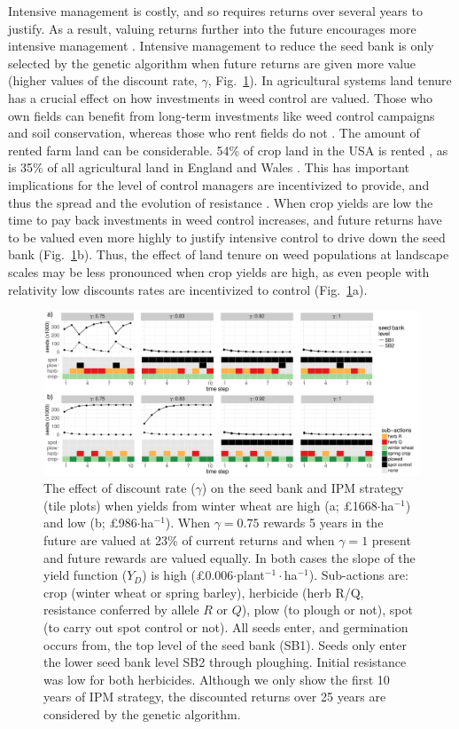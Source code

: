 \documentclass[9pt,twocolumn,twoside,lineno]{pnas-new}
\begin{document}
Intensive management is costly, and so requires returns over several years to justify. As a result, valuing returns further into the future encourages more intensive management \citep{EpanN2010}. Intensive management to reduce the seed bank is only selected by the genetic algorithm when future returns are given more value (higher values of the discount rate, $\gamma$, Fig.\ \ref{fig:dis_rate}). In agricultural systems land tenure has a crucial effect on how investments in weed control are valued. Those who own fields can benefit from long-term investments like weed control campaigns and soil conservation, whereas those who rent fields do not \citep{Wies1996, Fras2004}. The amount of rented farm land can be considerable. 54\% of crop land in the USA is rented \citep{Bige2016}, as is 35\% of all agricultural land in England and Wales \citep{CAAV2017}. This has important implications for the level of control managers are incentivized to provide, and thus the spread and the evolution of resistance \citep{Mare2012}. When crop yields are low the time to pay back investments in weed control increases, and future returns have to be valued even more highly to justify intensive control to drive down the seed bank (Fig.\ \ref{fig:dis_rate}b). Thus, the effect of land tenure on weed populations at landscape scales may be less pronounced when crop yields are high, as even people with relativity low discounts rates are incentivized to control (Fig.\ \ref{fig:dis_rate}a).

\begin{figure}
	\includegraphics[width=178mm]{dis_rate_SB_strat.pdf}
	\caption{The effect of discount rate ($\gamma$) on the seed bank and IPM strategy (tile plots) when yields from winter wheat are high (a; \pounds 1668$\cdot$ha$^{-1}$) and low (b; \pounds 986$\cdot$ha$^{-1}$). When $\gamma = 0.75$ rewards 5 years in the future are valued at 23\% of current returns and when $\gamma = 1$ present and future rewards are valued equally. In both cases the slope of the yield function ($Y_D$) is high (\pounds 0.006$\cdot$plant$^{-1}\cdot$ha$^{-1}$). Sub-actions are: crop (winter wheat or spring barley), herbicide (herb R/Q, resistance conferred by allele $R$ or $Q$), plow (to plough or not), spot (to carry out spot control or not). All seeds enter, and germination occurs from, the top level of the seed bank (SB1). Seeds only enter the lower seed bank level SB2 through ploughing. Initial resistance was low for both herbicides. Although we only show the first 10 years of IPM strategy, the discounted returns over 25 years are considered by the genetic algorithm.}
	\label{fig:dis_rate} 
\end{figure}
\end{document}
